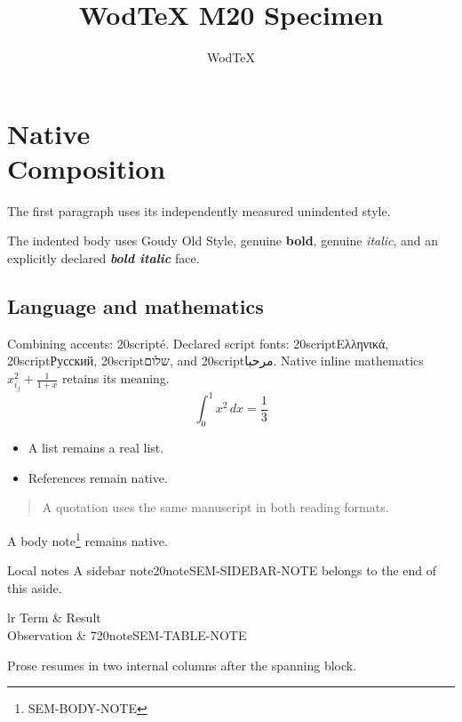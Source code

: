 \documentclass{m20book}
\title{WodTeX M20 Specimen}
\author{WodTeX}
\begin{document}
\maketitle
\tableofcontents
\chapter{Native\\Composition}
\label{ch:composition}
The first paragraph uses its independently measured unindented style.
\par The indented body uses Goudy Old Style, genuine \textbf{bold}, genuine
\textit{italic}, and an explicitly declared \textbf{\textit{bold italic}} face.
\section[Language and mathematics]{Language and mathematics}
Combining accents: \m20script{é}. Declared script fonts:
\foreignlanguage{greek}{\m20script{Ελληνικά}}, \foreignlanguage{russian}{\m20script{Русский}},
\foreignlanguage{hebrew}{\m20script{שלום}}, and \foreignlanguage{arabic}{\m20script{مرحبا}}.
Native inline mathematics $x_{i_j}^{2}+\frac{1}{1+x}$ retains its meaning.
\begin{equation}\int_0^1 x^2\,dx=\frac13\end{equation}
\begin{itemize}\item A list remains a real list.\item References remain native.\end{itemize}
\begin{quote}A quotation uses the same manuscript in both reading formats.\end{quote}
A body note\footnote{SEM-BODY-NOTE} remains native.
\begin{m20sidebarwide}[columns=2,id=notes]{Local notes}
A sidebar note\m20note{SEM-SIDEBAR-NOTE} belongs to the end of this aside.
\begin{m20table}[id=note-table,head-rows=1,width=column,scale=.75,align=right]{lr}
Term & Result \\ Observation & 7\m20note{SEM-TABLE-NOTE} \\
\end{m20table}
Prose resumes in two internal columns after the spanning block.
\end{m20sidebarwide}


\end{document}
